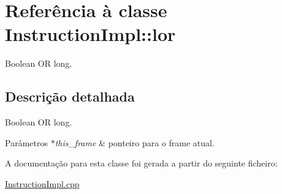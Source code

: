 \hypertarget{class_instruction_impl_1_1lor}{}\section{Referência à classe Instruction\+Impl\+:\+:lor}
\label{class_instruction_impl_1_1lor}


Boolean OR long.  




\subsection{Descrição detalhada}
Boolean OR long. 


\begin{DoxyParams}{Parâmetros}
{\em $\ast$this\+\_\+frame} & ponteiro para o frame atual.  \\
\hline
\end{DoxyParams}


A documentação para esta classe foi gerada a partir do seguinte ficheiro\+:\begin{DoxyCompactItemize}
\item 
\hyperlink{_instruction_impl_8cpp}{Instruction\+Impl.\+cpp}\end{DoxyCompactItemize}
